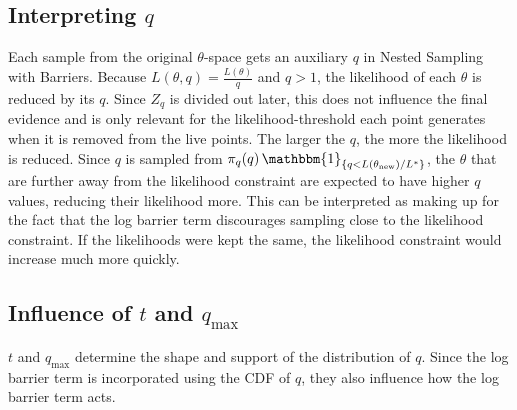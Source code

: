 \documentclass[12pt, a4paper]{report}
\begin{document}
\subsection{Interpreting $q$}
Each sample from the original $\theta$-space gets an auxiliary $q$ in Nested Sampling with Barriers.
Because $L(\theta, q) = \frac{L(\theta)}{q}$ and $q > 1$, the likelihood of each $\theta$ is reduced by its $q$.
Since $Z_q$ is divided out later, this does not influence the final evidence and is only relevant for the likelihood-threshold each point generates when it is removed from the live points.
The larger the $q$, the more the likelihood is reduced.
Since $q$ is sampled from $\pi_q(q) \, \mathbbm{1}_{\{q < L(\theta_{\textrm{new}}) / L^*\}}$, the $\theta$ that are further away from the likelihood constraint are expected to have higher $q$ values, reducing their likelihood more.
This can be interpreted as making up for the fact that the log barrier term discourages sampling close to the likelihood constraint.
If the likelihoods were kept the same, the likelihood constraint would increase much more quickly.

\subsection{Influence of $t$ and $q_{\textrm{max}}$}
$t$ and $q_{\textrm{max}}$ determine the shape and support of the distribution of $q$.
Since the log barrier term is incorporated using the CDF of $q$, they also influence how the log barrier term acts.
\end{document}
